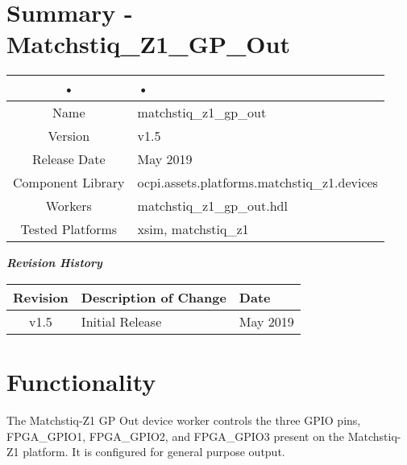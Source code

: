 \documentclass{article}
\author{} %
\date{Version \docVersion} %
\title{\docTitle}
\begin{document}
\section*{Summary - Matchstiq\_Z1\_GP\_Out}
	\begin{tabular}{|c|M{13.5cm}|}
		\hline
		• & • \\
		\hline
		Name & matchstiq\_z1\_gp\_out \\
		\hline
		Version & v1.5 \\
		\hline
		Release Date & May 2019 \\
		\hline
		Component Library & ocpi.assets.platforms.matchstiq\_z1.devices \\
		\hline
		Workers & matchstiq\_z1\_gp\_out.hdl \\
		\hline
		Tested Platforms & xsim, matchstiq\_z1 \\
		\hline
	\end{tabular}
	
\begin{center}
	\textit{\textbf{Revision History}}
		\begin{table}[H]
		\label{table:revisions} %
			\begin{tabularx}{\textwidth}{|c|X|l|}
			\hline
			\rowcolor{blue}
			\textbf{Revision} & \textbf{Description of Change} & \textbf{Date} \\
		    \hline
		    v1.5 & Initial Release & May 2019 \\
		    \hline
			\end{tabularx}
		\end{table}
	\end{center}	
	
\section*{Functionality}
\begin{flushleft}
The Matchstiq-Z1 GP Out device worker controls the three GPIO pins, FPGA\_GPIO1, FPGA\_GPIO2, and FPGA\_GPIO3 present on the Matchstiq-Z1 platform. It is configured for general purpose output.

\end{flushleft}
\end{document}
